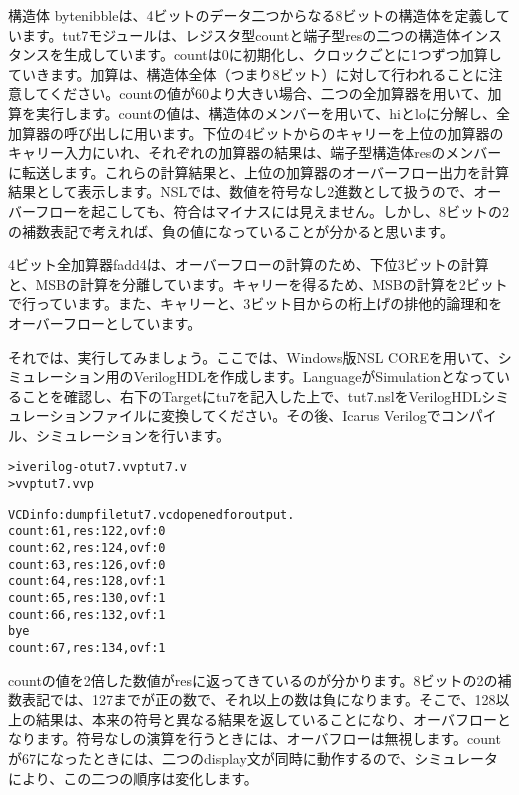 構造体 byte\textunderscore{}nibbleは、4ビットのデータ二つからなる8ビットの構造体を定義しています。tut7モジュールは、レジスタ型countと端子型resの二つの構造体インスタンスを生成しています。countは0に初期化し、クロックごとに1つずつ加算していきます。加算は、構造体全体（つまり8ビット）に対して行われることに注意してください。countの値が60より大きい場合、二つの全加算器を用いて、加算を実行します。countの値は、構造体のメンバーを用いて、hiとloに分解し、全加算器の呼び出しに用います。下位の4ビットからのキャリーを上位の加算器のキャリー入力にいれ、それぞれの加算器の結果は、端子型構造体resのメンバーに転送します。これらの計算結果と、上位の加算器のオーバーフロー出力を計算結果として表示します。NSLでは、数値を符号なし2進数として扱うので、オーバーフローを起こしても、符合はマイナスには見えません。しかし、8ビットの2の補数表記で考えれば、負の値になっていることが分かると思います。

4ビット全加算器fadd4は、オーバーフローの計算のため、下位3ビットの計算と、MSBの計算を分離しています。キャリーを得るため、MSBの計算を2ビットで行っています。また、キャリーと、3ビット目からの桁上げの排他的論理和をオーバーフローとしています。

それでは、実行してみましょう。ここでは、Windows版NSL COREを用いて、シミュレーション用のVerilogHDLを作成します。LanguageがSimulationとなっていることを確認し、右下のTargetにtu7を記入した上で、tut7.nslをVerilogHDLシミュレーションファイルに変換してください。その後、Icarus Verilogでコンパイル、シミュレーションを行います。

\begin{reviewcmd}
\begin{alltt}
\textgreater{} iverilog -otut7.vvp tut7.v
\textgreater{} vvp tut7.vvp

VCD info: dumpfile tut7.vcd opened for output.
count: 61, res:122, ovf:0
count: 62, res:124, ovf:0
count: 63, res:126, ovf:0
count: 64, res:128, ovf:1
count: 65, res:130, ovf:1
count: 66, res:132, ovf:1
bye
count: 67, res:134, ovf:1
\end{alltt}
\end{reviewcmd}

countの値を2倍した数値がresに返ってきているのが分かります。8ビットの2の補数表記では、127までが正の数で、それ以上の数は負になります。そこで、128以上の結果は、本来の符号と異なる結果を返していることになり、オーバフローとなります。符号なしの演算を行うときには、オーバフローは無視します。countが67になったときには、二つの\textunderscore{}display文が同時に動作するので、シミュレータにより、この二つの順序は変化します。

